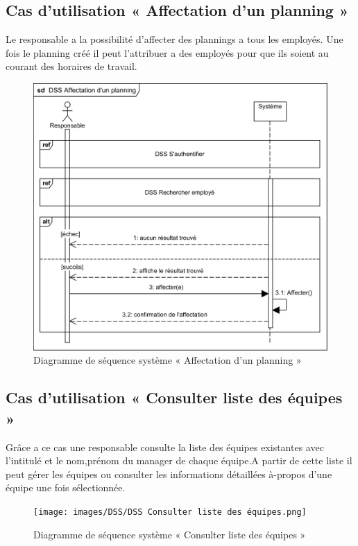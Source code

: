     \subsection*{Cas d'utilisation « Affectation d'un planning »}
    Le responsable a la possibilité d'affecter des plannings a tous les employés. Une fois le planning créé il peut l'attribuer a des employés pour que ils soient au courant  des horaires de travail.  
    \clearpage
        \begin{figure}[h!]
             \centering
            \includegraphics[scale=0.85]{images/DSS/DSS Affectation d'un planning.png}
             \caption{Diagramme de séquence système « Affectation d'un planning »}
             \label{fig4}
        \end{figure}
    
    
    
    
    \subsection*{Cas d'utilisation « Consulter liste des équipes »}
    Grâce a ce cas une responsable consulte la liste des équipes existantes avec l'intitulé et le nom,prénom du manager de chaque équipe.A partir de cette liste il peut gérer les équipes ou consulter les informations détaillées à-propos d'une équipe une fois sélectionnée.  
    \clearpage
        \begin{figure}[h!]
             \centering
            \texttt{[image: images/DSS/DSS Consulter liste des équipes.png]}
             \caption{Diagramme de séquence système « Consulter liste des équipes »}
             \label{fig4}
        \end{figure}
        
